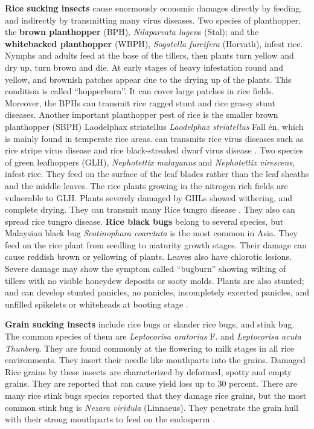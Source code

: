 \textbf{Rice sucking insects} cause enormously economic damages directly by feeding, and indirectly by transmitting many virus diseases. Two species of planthopper, the \textbf{brown planthopper} (BPH), \textit{Nilaparvata lugen}s (Stal); and the \textbf{whitebacked planthopper} (WBPH), \textit{Sogatella furcifera} (Horvath), infest rice. Nymphs and adults feed at the base of the tillers, then plants turn yellow and dry up, turn brown and die. At early stages of heavy infestation round and yellow, and brownish patches appear due to the drying up of the plants. This condition is called ``hopperburn''. It can cover large patches in rice fields. Moreover, the BPHs can transmit rice ragged stunt and rice grassy stunt diseases. Another important planthopper pest of rice is the smaller brown planthopper (SBPH) Laodelphax striatellus  \textit{Laodelphax striatellus} Fall \'en, which is mainly found in temperate rice areas. can transmits rice virus diseases such as rice stripe virus disease and rice black-streaked dwarf virus disease \cite{Zhang_2014_Small}. Two species of green leafhoppers (GLH), \textit{Nephotettix malayanus} and \textit{Nephotettix virescens}, infest rice. They feed on the surface of the leaf blades rather than the leaf sheaths and the middle leaves. The rice plants growing in the nitrogen rich fields are vulnerable to GLH.  Plants severely damaged by GHLs showed withering, and complete drying. They can transmit many Rice tungro disease \citep{Ling_1972_Rice}. They also can spread rice tungro disease. \textbf{Rice black bugs} belong to several species, but Malaysian black bug \textit{Scotinophara coarctata} is the most common in Asia. They feed on the rice plant from seedling to maturity growth stages. Their damage can cause reddish brown or yellowing of plants. Leaves also have chlorotic lesions. Severe damage may show the symptom called ``bugburn'' showing wilting of tillers with no visible honeydew deposits or sooty molds. Plants are also stunted; and can develop stunted panicles, no panicles, incompletely excerted panicles, and unfilled spikelets or whiteheads at booting stage \citep{Shepard_1995_Rice}. 


\textbf{Grain sucking insects} include rice bugs or slander rice bugs, and stink bug. The common species of them are \textit{Leptocorisa oratorius} F. and \textit{Leptocorisa acuta Thunberg}. They are found commonly at the flowering to milk stages in all rice environments. They insert their needle like mouthparts into the grains. Damaged Rice grains by these insects are characterized by deformed, spotty and empty grains. They are reported that can cause yield loss up to 30 percent. There are many rice stink bugs species reported that they damage rice grains, but the most common stink bug is \textit{Nezara viridula} (Linnaeus). They penetrate the grain hull with their strong mouthparts to feed on the endosperm \citep{Shepard_1995_Rice}. 


